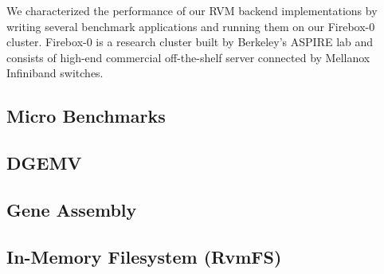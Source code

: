 We characterized the performance of our RVM backend implementations by writing
several benchmark applications and running them on our Firebox-0 cluster.
Firebox-0 is a research cluster built by Berkeley's ASPIRE lab and consists
of high-end commercial off-the-shelf server connected by Mellanox Infiniband
switches.


\subsection{Micro Benchmarks}



\subsection{DGEMV}



\subsection{Gene Assembly}



\subsection{In-Memory Filesystem (RvmFS)}


